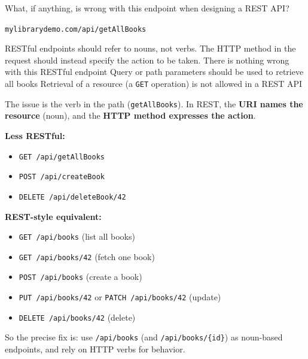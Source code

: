 \question[4]
What, if anything, is wrong with this endpoint when designing a REST API?
\begin{center}
  \texttt{mylibrarydemo.com/api/getAllBooks}
\end{center}
\begin{choices}
  \CorrectChoice RESTful endpoints should refer to nouns, not verbs. The HTTP method in the request should instead specify the action to be taken.
  \choice There is nothing wrong with this RESTful endpoint
  \choice Query or path parameters should be used to retrieve all books
  \choice Retrieval of a resource (a \texttt{GET} operation) is not allowed in a REST API
\end{choices}
\begin{solution}
  The issue is the verb in the path (\texttt{getAllBooks}). In REST, the \textbf{URI names the resource} (noun), and the \textbf{HTTP method expresses the action}.

  \textbf{Less RESTful:}
  \begin{itemize}
    \item \texttt{GET /api/getAllBooks}
    \item \texttt{POST /api/createBook}
    \item \texttt{DELETE /api/deleteBook/42}
  \end{itemize}

  \textbf{REST-style equivalent:}
  \begin{itemize}
    \item \texttt{GET /api/books} \quad (list all books)
    \item \texttt{GET /api/books/42} \quad (fetch one book)
    \item \texttt{POST /api/books} \quad (create a book)
    \item \texttt{PUT /api/books/42} or \texttt{PATCH /api/books/42} \quad (update)
    \item \texttt{DELETE /api/books/42} \quad (delete)
  \end{itemize}

  So the precise fix is: use \texttt{/api/books} (and \texttt{/api/books/\{id\}}) as noun-based endpoints, and rely on HTTP verbs for behavior.
\end{solution}

